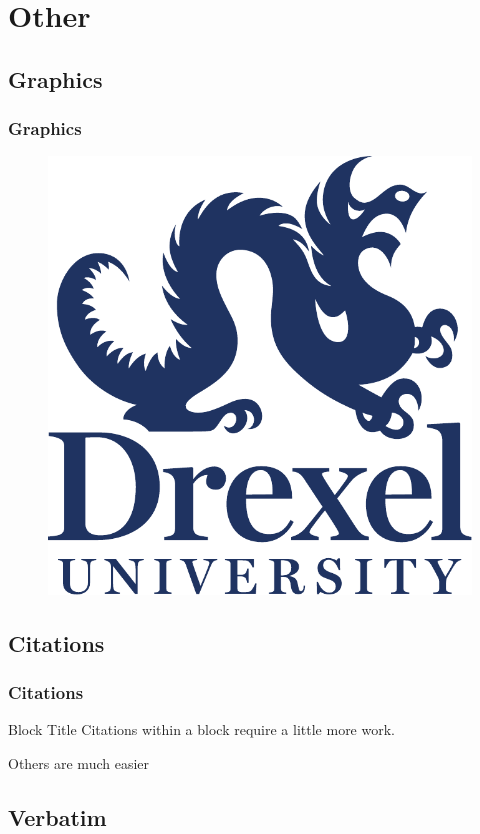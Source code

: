 \documentclass[sans,10pt]{beamer}
\begin{document}
\section{Other}

\expandedtoc{}

\subsection{Graphics}

\begin{frame}
\frametitle{Graphics}
\begin{figure}
\centering
\includegraphics[width=.5\textwidth]{drexel-logo}
\end{figure}
\end{frame}

\subsection{Citations}

\begin{frame}
\frametitle{Citations}
\begin{block}{Block Title}
Citations within a block require a little more work.~\footnotemark
\end{block}
Others are much easier
\end{frame}

\subsection{Verbatim}
\end{document}
